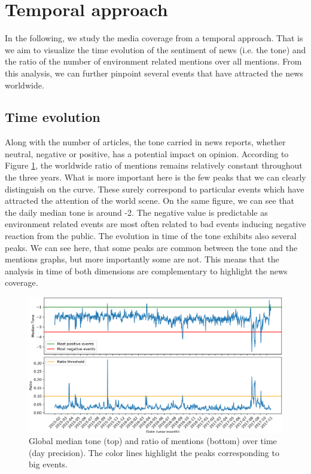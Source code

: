 \documentclass[11pt]{article}
\begin{document}
\section{Temporal approach}
In the following, we study the media coverage from a temporal approach. That is we aim to visualize the time evolution of the sentiment of news (i.e. the tone) and the ratio of the number of environment related mentions over all mentions. From this analysis, we can further pinpoint several events that have attracted the news worldwide.

\subsection{Time evolution}
Along with the number of articles, the tone carried in news reports, whether neutral, negative or positive, has a potential impact on opinion. 
According to Figure \ref{time_evolu}, the worldwide ratio of mentions remains relatively constant throughout the three years. What is more important here is the few peaks that we can clearly distinguish on the curve. These surely correspond to particular events which have attracted the attention of the world scene.
On the same figure, we can see that the daily median tone is around -2. The negative value is predictable as environment related events are most often related to bad events inducing negative reaction from the public. The evolution in time of the tone exhibits also several peaks. We can see here, that some peaks are common between the tone and the mentions graphs, but more importantly some are not. This means that the analysis in time of both dimensions are complementary to highlight the news coverage. 

\begin{figure}
   \includegraphics[scale=0.3]{global_ratio_tone_plot.png}
    \caption{\label{time_evolu} Global median tone (top) and ratio of mentions (bottom) over time (day precision). The color lines highlight the peaks corresponding to big events.}
\end{figure}
\end{document}
